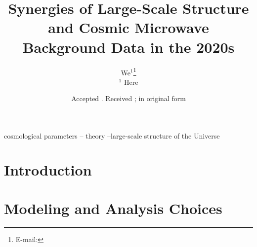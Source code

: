 \documentclass[fleqn,usenatbib,useAMS]{mnras}
\title[LSST x SO]{Synergies of Large-Scale Structure and Cosmic Microwave Background Data in the 2020s}
\author[]{We$^{1}$\thanks{E-mail:}
\\
$^{1}$ Here
}
\begin{document}
\date{Accepted . Received ; in original form }

\pagerange{\pageref{firstpage}--\pageref{lastpage}} 

\maketitle

\label{firstpage}

\begin{abstract} 
\end{abstract}


\begin{keywords}
cosmological parameters -- theory --large-scale structure of the Universe
\end{keywords}

\renewcommand{\thefootnote}{\arabic{footnote}}
\setcounter{footnote}{0}


\section{Introduction}
\label{sec:intro}


\section{Modeling and Analysis Choices}
\label{sec:modeling}
\end{document}
